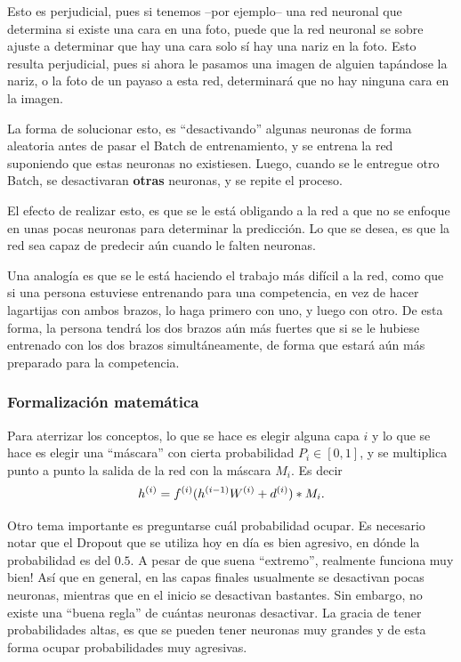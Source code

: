 Esto es perjudicial, pues si tenemos --por ejemplo-- una red neuronal que determina si existe una cara en una foto, puede que la red neuronal se sobre ajuste a determinar que hay una cara solo sí hay una nariz en la foto. Esto resulta perjudicial, pues si ahora le pasamos una imagen de alguien tapándose la nariz, o la foto de un payaso a esta red, determinará que no hay ninguna cara en la imagen.

La forma de solucionar esto, es ``desactivando'' algunas neuronas de forma aleatoria antes de pasar el Batch de entrenamiento, y se entrena la red suponiendo que estas neuronas no existiesen. Luego, cuando se le entregue otro Batch, se desactivaran \textbf{otras} neuronas, y se repite el proceso.

El efecto de realizar esto, es que se le está obligando a la red a que no se enfoque en unas pocas neuronas para determinar la predicción. Lo que se desea, es que la red sea capaz de predecir aún cuando le falten neuronas. 

Una analogía es que se le está haciendo el trabajo más difícil a la red, como que si una persona estuviese entrenando para una competencia, en vez de hacer lagartijas con ambos brazos, lo haga primero con uno, y luego con otro. De esta forma, la persona tendrá los dos brazos aún más fuertes que si se le hubiese entrenado con los dos brazos simultáneamente, de forma que estará aún más preparado para la competencia.

\subsubsection{Formalización matemática}

Para aterrizar los conceptos, lo que se hace es elegir alguna capa $i$ y lo que se hace es elegir una ``máscara'' con cierta probabilidad $P_i \in [0, 1]$, y se multiplica punto a punto la salida de la red con la máscara $M_i$. Es decir
\begin{equation}
    h\entr = f\entr(h\entr[i-1] W\entr + d\entr) \ast M_i.
\end{equation}

Otro tema importante es preguntarse cuál probabilidad ocupar. Es necesario notar que el Dropout que se utiliza hoy en día es bien agresivo, en dónde la probabilidad es del $0.5$. A pesar de que suena ``extremo'', realmente funciona muy bien! Así que en general, en las capas finales usualmente se desactivan pocas neuronas, mientras que en el inicio se desactivan bastantes. Sin embargo, no existe una ``buena regla'' de cuántas neuronas desactivar. La gracia de tener probabilidades altas, es que se pueden tener neuronas muy grandes y de esta forma ocupar probabilidades muy agresivas.

